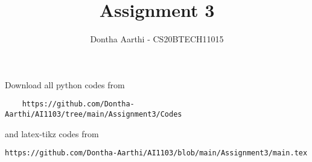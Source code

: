 \documentclass[journal,12pt,twocolumn]{IEEEtran}
\DeclareMathOperator*{\Res}{Res}
\begin{document}
\newcommand{\BEQA}{\begin{eqnarray}}
\newcommand{\EEQA}{\end{eqnarray}}
\newcommand{\define}{\stackrel{\triangle}{=}}

\raggedbottom
\setlength{\parindent}{0pt}
\providecommand{\mbf}{\mathbf}
\providecommand{\pr}[1]{\ensuremath{\Pr\left(#1\right)}}
\providecommand{\qfunc}[1]{\ensuremath{Q\left(#1\right)}}
\providecommand{\sbrak}[1]{\ensuremath{{}\left[#1\right]}}
\providecommand{\lsbrak}[1]{\ensuremath{{}\left[#1\right.}}
\providecommand{\rsbrak}[1]{\ensuremath{{}\left.#1\right]}}
\providecommand{\brak}[1]{\ensuremath{\left(#1\right)}}
\providecommand{\lbrak}[1]{\ensuremath{\left(#1\right.}}
\providecommand{\rbrak}[1]{\ensuremath{\left.#1\right)}}
\providecommand{\cbrak}[1]{\ensuremath{\left\{#1\right\}}}
\providecommand{\lcbrak}[1]{\ensuremath{\left\{#1\right.}}
\providecommand{\rcbrak}[1]{\ensuremath{\left.#1\right\}}}
\theoremstyle{remark}
\newtheorem{rem}{Remark}
\newcommand{\sgn}{\mathop{\mathrm{sgn}}}
\providecommand{\abs}[1]{\vert#1\vert}
\providecommand{\res}[1]{\Res\displaylimits_{#1}} 
\providecommand{\norm}[1]{\lVert#1\rVert}
\providecommand{\mtx}[1]{\mathbf{#1}}
\providecommand{\mean}[1]{E[ #1 ]}
\providecommand{\fourier}{\overset{\mathcal{F}}{ \rightleftharpoons}}
\providecommand{\system}{\overset{\mathcal{H}}{ \longleftrightarrow}}
\newcommand{\solution}{\noindent \textbf{Solution: }}
\newcommand{\cosec}{\,\text{cosec}\,}
\providecommand{\dec}[2]{\ensuremath{\overset{#1}{\underset{#2}{\gtrless}}}}
\newcommand{\myvec}[1]{\ensuremath{\begin{pmatrix}#1\end{pmatrix}}}
\newcommand{\mydet}[1]{\ensuremath{\begin{vmatrix}#1\end{vmatrix}}}
\makeatletter
{}
\makeatother
\let\StandardTheFigure\thefigure
\let\vec\mathbf
\renewcommand{\thefigure}{\theproblem}
\def\putbox#1#2#3{\makebox[0in][l]{\makebox[#1][l]{}\raisebox{\baselineskip}[0in][0in]{\raisebox{#2}[0in][0in]{#3}}}}
     \def\rightbox#1{\makebox[0in][r]{#1}}
     \def\centbox#1{\makebox[0in]{#1}}
     \def\topbox#1{\raisebox{-\baselineskip}[0in][0in]{#1}}
     \def\midbox#1{\raisebox{-0.5\baselineskip}[0in][0in]{#1}}
\vspace{3cm}
\title{Assignment 3}
\author{Dontha Aarthi - CS20BTECH11015}
\maketitle
\newpage
\bigskip
\renewcommand{\thefigure}{\theenumi}
\renewcommand{\thetable}{\theenumi}
Download all python codes from 
\begin{lstlisting}
    https://github.com/Dontha-Aarthi/AI1103/tree/main/Assignment3/Codes
\end{lstlisting}
and latex-tikz codes from 
\begin{lstlisting}
https://github.com/Dontha-Aarthi/AI1103/blob/main/Assignment3/main.tex
\end{lstlisting}
\end{document}
